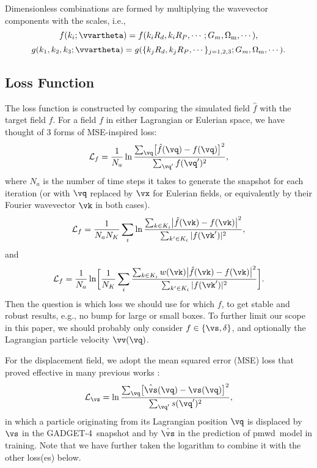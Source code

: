 \documentclass[modern, trackchanges, dvipsnames]{aastex631}
\newcommand{\pmwd}{{\usefont{T1}{nova}{m}{sl}pmwd}}
\newcommand{\GADGET}{{{\fontsize{10pt}{12pt}\selectfont GADGET}-4}}
\newcommand{\cL}{\mathcal{L}}
\newcommand{\Omegam}{\Omega_\mathrm{m}}
\newcommand{\YL}[1]{\textcolor{Bittersweet}{#1}}
\begin{document}
Dimensionless combinations are formed by multiplying the wavevector components
with the scales, i.e.,
%
\begin{equation}
f(k_i; \vvartheta) = f(k_iR_d, k_iR_P, \cdots; G_m, \Omegam, \cdots),
\end{equation}
%
\begin{equation}
g(k_1, k_2, k_3; \vvartheta) = g(\{k_jR_d, k_jR_P, \cdots\}_{j=1,2,3}; G_m, \Omegam, \cdots).
\end{equation}
%


\vspace{1em}
\subsection{Loss Function}

The loss function is constructed by comparing the simulated field $\hat f$ with
the target field $f$.
\YL{
For a field $f$ in either Lagrangian or Eulerian space, we have thought
of 3 forms of MSE-inspired loss:
%
\begin{equation}
\cL_f = \frac1{N_a} \ln
  \frac{\sum_\vq \bigl[ \hat f(\vq) - f(\vq) \bigr]^2}
       {\sum_{\vq'} f(\vq')^2},
\end{equation}
%
where $N_a$ is the number of time steps it takes to generate the snapshot for
each iteration
(or with $\vq$ replaced by $\vx$ for Eulerian fields, or equivalently by
their Fourier wavevector $\vk$ in both cases).
%
\begin{equation}
\cL_f = \frac1{N_a N_K} \sum_i \ln
\frac{\sum_{k \in K_i} \bigl| \hat f(\vk) - f(\vk) \bigr|^2}
     {\sum_{k' \in K_i} | f(\vk')|^2},
\end{equation}
%
and
%
\begin{equation}
\cL_f = \frac1{N_a} \ln \biggl[ \frac1{N_K} \sum_i
\frac{\sum_{k \in K_i} w(\vk)
      \bigl| \hat f(\vk) - f(\vk) \bigr|^2}
     {\sum_{k' \in K_i} |f(\vk')|^2} \biggl].
\end{equation}
%
Then the question is which loss we should use for which $f$, to get
stable and robust results, e.g., no bump for large or small boxes.
To further limit our scope in this paper, we should probably only
consider $f \in \{\vs, \delta\}$, and optionally the Lagrangian particle
velocity $\vv(\vq)$.
}

For the displacement field, we adopt the mean squared error (MSE) loss
that proved effective in many previous works
\citep[e.g.,][]{HeEtAl2019, LiEtAl2021}:
%
\begin{equation}
\cL_\vs = \ln \frac{\sum_\vq \bigl[ \hat\vs(\vq) - \vs(\vq) \bigr]^2}
                   {\sum_{\vq'} s(\vq')^2},
\end{equation}
%
in which a particle originating from its Lagrangian position $\vq$ is
displaced by $\vs$ in the \GADGET\ snapshot and by $\hat\vs$ in the
prediction of \pmwd\ model in training.
Note that we have further taken the logarithm to combine it with the
other loss(es) below.
\end{document}

